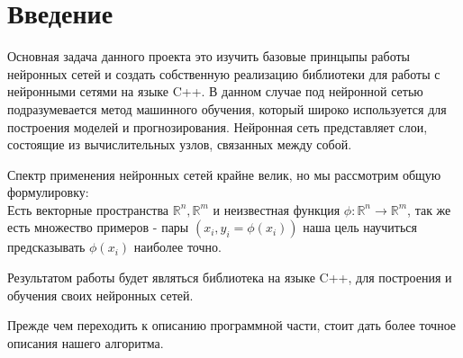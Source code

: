 \documentclass{article}
\newcommand{\R}{\mathbb{R}}
\begin{document}
\makeTitlePage

\tableofcontents



\section{Введение}
Основная задача данного проекта это изучить базовые принцыпы работы
нейронных сетей и создать собственную реализацию библиотеки для работы с нейронными 
сетями на языке C++. В данном случае под нейронной сетью подразумевается метод 
машинного обучения, который широко используется для построения моделей и прогнозирования.
Нейронная сеть представляет слои, состоящие из вычислительных узлов, связанных между 
собой. 

Спектр применения нейронных сетей крайне велик, но мы рассмотрим общую формулировку:\\
Есть векторные пространства $\R^n, \R^m$ и неизвестная функция $\phi: \R^n \to \R^m$, 
так же есть множество примеров - пары $(x_i, y_i = \phi(x_i))$ наша цель научиться 
предсказывать $\phi(x_i)$ наиболее точно. 


Результатом работы будет являться библиотека на языке C++, 
для построения и обучения своих нейронных сетей. 

Прежде чем переходить к описанию программной части, 
стоит дать более точное описания нашего алгоритма.
\end{document}
